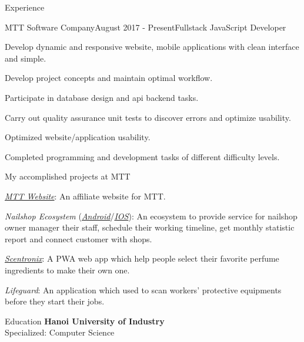 \documentclass{resume}
\begin{document}
  \begin{rSection}{Experience}
    \begin{rSubsection}{MTT Software Company}{August 2017 - Present}{Fullstack JavaScript Developer}{}
      \item Develop dynamic and responsive website, mobile applications with clean interface and simple.
      \item Develop project concepts and maintain optimal workflow.
      \item Participate in database design and api backend tasks.
      \item Carry out quality assurance unit tests to discover errors and optimize usability.
      \item Optimized website/application usability.
      \item Completed programming and development tasks of different difficulty levels.
    \end{rSubsection}

    \begin{rSubsection}{}{}{My accomplished projects at MTT}{}
      \item \href{https://mttjsc.com/}{\emph{MTT Website}}: An affiliate website for MTT.
      \item \emph{Nailshop Ecosystem} (\href{https://play.google.com/store/apps/developer?id=MTT+Software+Company+LTD}{\emph{Android}}/\href{https://apps.apple.com/us/developer/mttjsc/id1250334932}{\emph{IOS}}): 
      An ecosystem to provide service for nailshop owner manager their
      staff, schedule their working timeline, get monthly statistic report and connect customer with shops.
      \item \href{https://app.scnt.me/}{\emph{Scentronix}}: A PWA web app which help people select their favorite perfume ingredients to make their own one.
      \item {\emph{Lifeguard}}: An application which used to scan workers' protective equipments before they start their jobs. 
    \end{rSubsection}
  \end{rSection}

  {}{}
  \begin{rSection}{Education}
    {\bf Hanoi University of Industry} \\ 
    { Specialized: Computer Science } \\
  \end{rSection}
\end{document}
